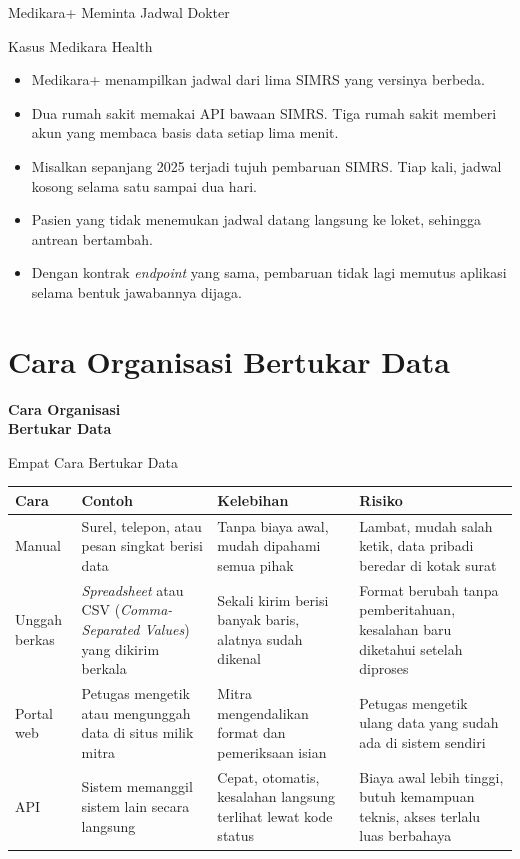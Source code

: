 \documentclass[aspectratio=169, table, 12pt]{beamer}
\begin{document}
\begin{frame}{{\Large Medikara+ Meminta Jadwal Dokter}}
  \begin{block}{Kasus Medikara Health}
    \small
    \begin{itemize}
      \item Medikara+ menampilkan jadwal dari lima SIMRS yang versinya berbeda.
      \item Dua rumah sakit memakai API bawaan SIMRS. Tiga rumah sakit memberi akun yang membaca basis data setiap lima menit.
      \item Misalkan sepanjang 2025 terjadi tujuh pembaruan SIMRS. Tiap kali, jadwal kosong selama satu sampai dua hari.
      \item Pasien yang tidak menemukan jadwal datang langsung ke loket, sehingga antrean bertambah.
      \item Dengan kontrak \textit{endpoint} yang sama, pembaruan tidak lagi memutus aplikasi selama bentuk jawabannya dijaga.
    \end{itemize}
  \end{block}
\end{frame}

\section{Cara Organisasi Bertukar Data}

\begin{frame}{\hfill}
  \centering
  \Huge{\textbf{Cara Organisasi\\Bertukar Data}}
\end{frame}

\begin{frame}{{\Large Empat Cara Bertukar Data}}
  \scriptsize
  \begin{tabularx}{\textwidth}{>{\raggedright\arraybackslash}p{1.6cm}
      >{\raggedright\arraybackslash}X
      >{\raggedright\arraybackslash}X
      >{\raggedright\arraybackslash}X}
    \hline
    \textbf{Cara} & \textbf{Contoh} & \textbf{Kelebihan} & \textbf{Risiko} \\ \hline
    Manual & Surel, telepon, atau pesan singkat berisi data & Tanpa biaya awal, mudah dipahami semua pihak & Lambat, mudah salah ketik, data pribadi beredar di kotak surat \\ \hline
    Unggah berkas & \textit{Spreadsheet} atau CSV (\textit{Comma-Separated Values}) yang dikirim berkala & Sekali kirim berisi banyak baris, alatnya sudah dikenal & Format berubah tanpa pemberitahuan, kesalahan baru diketahui setelah diproses \\ \hline
    Portal web & Petugas mengetik atau mengunggah data di situs milik mitra & Mitra mengendalikan format dan pemeriksaan isian & Petugas mengetik ulang data yang sudah ada di sistem sendiri \\ \hline
    API & Sistem memanggil sistem lain secara langsung & Cepat, otomatis, kesalahan langsung terlihat lewat kode status & Biaya awal lebih tinggi, butuh kemampuan teknis, akses terlalu luas berbahaya \\ \hline
  \end{tabularx}
\end{frame}
\end{document}
